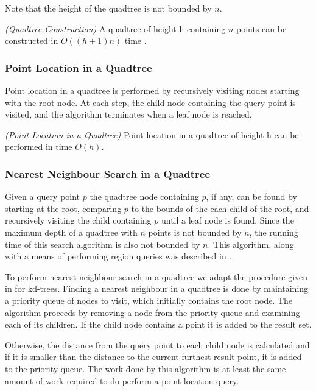 \documentclass[mcs]{scsthesis}
\begin{document}
Note that the height of the quadtree is not bounded by $n$.

\begin{thm} \emph{(Quadtree Construction)}
A quadtree of height h containing $n$ points can be constructed in \(O((h + 1)n)\)
time \cite{dutch}.
\end{thm}

\subsubsection{Point Location in a Quadtree}

Point location in a quadtree is performed by recursively visiting nodes
starting with the root node. At each step, the child node containing the query
point is visited, and the algorithm terminates when a leaf node is reached.

\begin{thm} \emph{(Point Location in a Quadtree)} 
Point location in a quadtree of height h can be performed in time \(O(h)\). 
\end{thm}

\subsubsection{Nearest Neighbour Search in a Quadtree}

Given a query point $p$ the quadtree node containing $p$, if any, can be found by
starting at the root, comparing $p$ to the bounds of the each child of the root,
and recursively visiting the child containing $p$ until a leaf node is found.  
Since the maximum depth of a quadtree with $n$ points is not bounded by $n$, the
running time of this search algorithm is also not bounded by $n$. This algorithm,
along with a means of performing region queries was described in
\cite{quadtree}.

To perform nearest neighbour search in a quadtree we adapt the procedure given
in \cite{samet} for kd-trees. Finding a nearest neighbour in a quadtree is done
by maintaining a priority queue of nodes to visit, which initially contains the
root node. The algorithm proceeds by removing a node from the priority queue and
examining each of its children. If the child node contains a point it is added
to the result set.

Otherwise, the distance from the query point to each child node is calculated
and if it is smaller than the distance to the current furthest result point,
it is added to the priority queue. The work done by this algorithm is at
least the same amount of work required to do perform a point location query.
\end{document}
